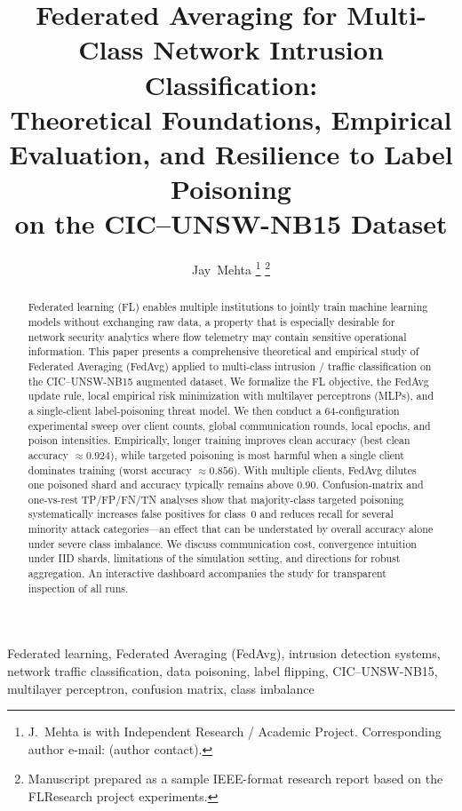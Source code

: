 \documentclass[journal]{IEEEtran}
\begin{document}
\title{Federated Averaging for Multi-Class Network Intrusion Classification:\\
Theoretical Foundations, Empirical Evaluation, and Resilience to Label Poisoning\\
on the CIC--UNSW-NB15 Dataset}

\author{Jay~Mehta%
\thanks{J.~Mehta is with Independent Research / Academic Project.
Corresponding author e-mail: (author contact).}%
\thanks{Manuscript prepared as a sample IEEE-format research report based on the FLResearch project experiments.}}

\maketitle

\begin{abstract}
Federated learning (FL) enables multiple institutions to jointly train machine learning models without exchanging raw data, a property that is especially desirable for network security analytics where flow telemetry may contain sensitive operational information. This paper presents a comprehensive theoretical and empirical study of Federated Averaging (FedAvg) applied to multi-class intrusion / traffic classification on the CIC--UNSW-NB15 augmented dataset. We formalize the FL objective, the FedAvg update rule, local empirical risk minimization with multilayer perceptrons (MLPs), and a single-client label-poisoning threat model. We then conduct a 64-configuration experimental sweep over client counts, global communication rounds, local epochs, and poison intensities. Empirically, longer training improves clean accuracy (best clean accuracy $\approx 0.924$), while targeted poisoning is most harmful when a single client dominates training (worst accuracy $\approx 0.856$). With multiple clients, FedAvg dilutes one poisoned shard and accuracy typically remains above $0.90$. Confusion-matrix and one-vs-rest TP/FP/FN/TN analyses show that majority-class targeted poisoning systematically increases false positives for class~0 and reduces recall for several minority attack categories---an effect that can be understated by overall accuracy alone under severe class imbalance. We discuss communication cost, convergence intuition under IID shards, limitations of the simulation setting, and directions for robust aggregation. An interactive dashboard accompanies the study for transparent inspection of all runs.
\end{abstract}

\begin{IEEEkeywords}
Federated learning, Federated Averaging (FedAvg), intrusion detection systems, network traffic classification, data poisoning, label flipping, CIC--UNSW-NB15, multilayer perceptron, confusion matrix, class imbalance
\end{IEEEkeywords}
\end{document}
